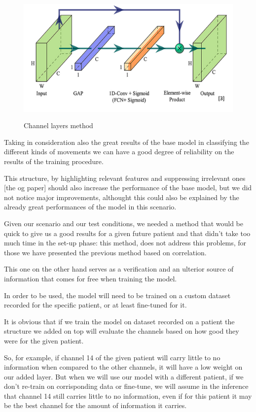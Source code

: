 \documentclass{Configuration_Files/PoliMi3i_thesis}
\begin{document}
\begin{figure}[H]
	\includegraphics[scale=0.35]{channelLayer.png}
	\centering
    \label{channel_layers}
    \caption{Channel layers method }
\end{figure}

Taking in consideration also the great results of the base model in classifying the different kinds of movements we can have a good degree of reliability on the results of the training procedure.

This structure, by highlighting relevant features and suppressing irrelevant ones [the og paper] should also increase the performance of the base model, but we did not notice major improvements, althought this could also be explained by the already great performances of the model in this scenario.

Given our scenario and our test conditions, we needed a method that would be quick to give us a good results for a given future patient and that didn't take too much time in the set-up phase: this method, does not address this problems, for those we have presented the previous method based on correlation.

This one on the other hand serves as a verification and an ulterior source of information that comes for free when training the model.

In order to be used, the model will need to be trained on a custom dataset recorded for the specific patient, or at least fine-tuned for it.

It is obvious that if we train the model on dataset recorded on a patient the structure we added on top will evaluate the channels based on how good they were for the given patient.

So, for example, if channel 14 of the given patient will carry little to no information when compared to the other channels, it will have a low weight on our added layer.
But when we will use our model with a different patient, if we don't re-train on corrisponding data or fine-tune, we will assume in the inference that channel 14 still carries little to no information, even if for this patient it may be the best channel for the amount of information it carries.
\end{document}

